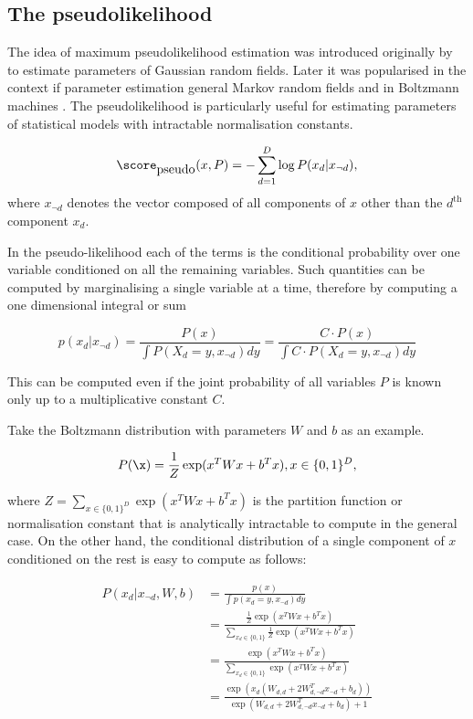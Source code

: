 \subsection{The pseudolikelihood}

The idea of maximum pseudolikelihood estimation was introduced originally by \citep{Besag1977} to estimate parameters of Gaussian random fields. Later it was popularised in the context if parameter estimation general Markov random fields \citep{Comets1992} and in Boltzmann machines \citep{Hyvarinen2006}. The pseudolikelihood is particularly useful for estimating parameters of statistical models with intractable normalisation constants.

\begin{equation}
	\score_{\mbox{pseudo}}(x,P) = - \sum_{d=1}^{D} \log P(x_d\vert x_{\neg d}),
\end{equation}
where $x_{\neg d}$ denotes the vector composed of all components of $x$ other than the $d^{\mbox{th}}$ component $x_d$. 

In the pseudo-likelihood each of the terms is the conditional probability over one variable conditioned on all the remaining variables. Such quantities can be computed by marginalising a single variable at a time, therefore by computing a one dimensional integral or sum

\begin{equation}
	p(x_d\vert x_{\neg d}) = \frac{P(x)}{\int P(X_d=y,x_{\neg d}) dy} = \frac{C \cdot P(x)}{\int C \cdot P(X_d=y,x_{\neg d}) dy}
\end{equation}

This can be computed even if the joint probability of all variables $P$ is known only up to a multiplicative constant $C$.

Take the Boltzmann distribution with parameters $W$ and $b$ as an example. 

\begin{equation}
	P(\x) = \frac{1}{Z}\exp(x^{T}Wx + b^{T}x), x\in\{0,1\}^D,
\end{equation}

where $Z = \sum_{x\in\{0,1\}^D}\exp(x^{T}Wx + b^{T}x)$ is the partition function or normalisation constant that is analytically intractable to compute in the general case. On the other hand, the conditional distribution of a single component of $x$ conditioned on the rest is easy to compute as follows:

\begin{align}
	P(x_d\vert x_{\neg d}, W, b) &= \frac{p(x)}{\int p(x_d=y,x_{\neg d}) dy}\\
		&= \frac{\frac{1}{Z}\exp(x^{T}Wx + b^{T}x)}{\sum_{x_d\in\{0,1\}}\frac{1}{Z}\exp(x^{T}Wx + b^{T}x)}\\
		&= \frac{\exp(x^{T}Wx + b^{T}x)}{\sum_{x_d\in\{0,1\}}\exp(x^{T}Wx + b^{T}x)}\\
		&= \frac{\exp\left( x_d \left( W_{d,d} + 2 W_{d,\neg d}^{T}x_{\neg d} + b_d \right)\right)}{\exp( W_{d,d} + 2 W_{d,\neg d}^{T}x_{\neg d} + b_{d}) + 1}\\
\end{align}

